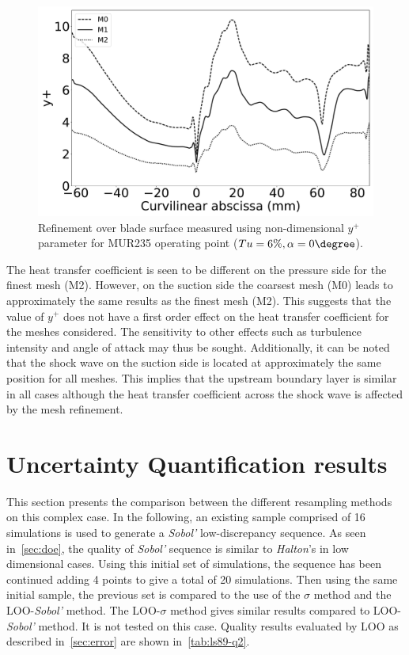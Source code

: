 \begin{figure}[!h]
\centering
\includegraphics[width=0.8\linewidth,keepaspectratio]{fig/applications/ls89/yplus_M0M1M2_comp.pdf}
\caption{Refinement over blade surface measured using non-dimensional $y^+$ parameter for MUR235 operating point ($Tu=6\%, \alpha = 0\degree$).}
\label{fig:M0M1M2_y+comp}
\end{figure}

The heat transfer coefficient is seen to be different on the pressure side for the finest mesh (M2). However, on the suction side the coarsest mesh (M0) leads to approximately the same results as the finest mesh (M2). This suggests that the value of $y^+$ does not have a first order effect on the heat transfer coefficient for the meshes considered. The sensitivity to other effects such as turbulence intensity and angle of attack may thus be sought. Additionally, it can be noted that the shock wave on the suction side is located at approximately the same position for all meshes. This implies that the upstream boundary layer is similar in all cases although the heat transfer coefficient across the shock wave is affected by the mesh refinement.

\section{Uncertainty Quantification results}\label{sec:ls89_results}

This section presents the comparison between the different resampling methods on this complex case. In the following, an existing sample comprised of 16 simulations is used to generate a \textit{Sobol'} low-discrepancy sequence. As seen in~\cref{sec:doe}, the quality of \textit{Sobol'} sequence is similar to \textit{Halton}'s in low dimensional cases. Using this initial set of simulations, the sequence has been continued adding 4 points to give a total of 20 simulations. Then using the same initial sample, the previous set is compared to the use of the $\sigma$ method and the LOO-\textit{Sobol'} method. The LOO-$\sigma$ method gives similar results compared to LOO-\textit{Sobol'} method. It is not tested on this case. Quality results evaluated by LOO as described in~\cref{sec:error} are shown in~\cref{tab:ls89-q2}. 

